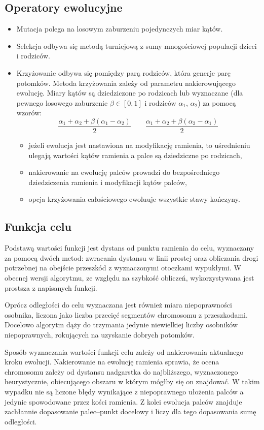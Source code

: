 \documentclass[11pt, leqno]{article}
\begin{document}
\subsection{Operatory ewolucyjne}

\begin{itemize}
	\item Mutacja polega na losowym zaburzeniu pojedynczych miar kątów.
	\item Selekcja odbywa się metodą turniejową z sumy mnogościowej populacji dzieci i rodziców.
	\item Krzyżowanie odbywa się pomiędzy parą rodziców, która generje parę potomków. Metoda krzyżowania zależy od parametru nakierowującego ewolucję. Miary kątów są dziedziczone po rodzicach lub wyznaczane (dla pewnego losowego zaburzenie $\beta\in[0, 1]$ i rodziców $\alpha_1$, $\alpha_2$) za pomocą wzorów:
	\[
		\frac{\alpha_1 + \alpha_2 + \beta(\alpha_1 - \alpha_2)}{2} \quad\quad \frac{\alpha_1 + \alpha_2 + \beta(\alpha_2 - \alpha_1)}{2}
	\]
	\begin{itemize}
		\item jeżeli ewolucja jest nastawiona na modyfikację ramienia, to uśrednieniu ulegają wartości kątów ramienia a palce są dziedziczne po rodzicach,
		\item nakierowanie na ewolucję palców prowadzi do bezpośredniego dziedziczenia ramienia i modyfikacji kątów palców,
		\item opcja krzyżowania całościowego ewoluuje wszystkie stawy kończyny.
	\end{itemize}
\end{itemize}

\subsection{Funkcja celu}
Podstawą wartości funkcji jest dystans od punktu ramienia do celu, wyznaczany za pomocą dwóch metod: zwracania dystansu w linii prostej oraz obliczania drogi potrzebnej na obejście przeszkód z wyznaczonymi otoczkami wypukłymi. W obecnej wersji algorytmu, ze względu na szybkość obliczeń, wykorzystywana jest prostsza z napisanych funkcji.

Oprócz odległości do celu wyznaczana jest również miara niepoprawności osobnika, liczona jako liczba przecięć segmentów chromosomu z przeszkodami. Docelowo algorytm dąży do trzymania jedynie niewielkiej liczby osobników niepoprawnych, rokujących na uzyskanie dobrych potomków.

Sposób wyznaczania wartości funkcji celu zależy od nakierowania aktualnego kroku ewolucji. Nakierowanie na ewolucję ramienia sprawia, że ocena chromosomu zależy od dystansu nadgarstka do najbliższego, wyznaczonego heurystycznie, obiecującego obszaru w którym mógłby się on znajdować. W takim wypadku nie są liczone błędy wynikające z niepoprawnego ułożenia palców a jedynie spowodowane przez kości ramienia. Z kolei ewolucja palców znajduje zachłannie dopasowanie palec--punkt docelowy i liczy dla tego dopasowania sumę odległości.
\end{document}
